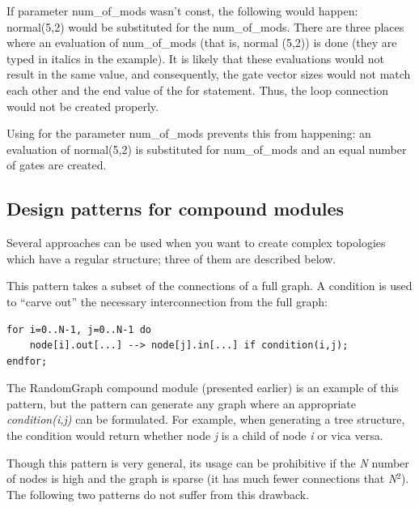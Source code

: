 If parameter num\_of\_mods wasn't const, the following would happen:\\
normal(5,2) would be substituted for the num\_of\_mods. There
are three places where an evaluation of num\_of\_mods (that is, normal
(5,2)) is done (they are typed in italics in the example). It
is likely that these evaluations would not result in the same
value, and consequently, the gate vector sizes would not match
each other and the end value of the for statement. Thus, the
loop connection would not be created properly.

Using  for the parameter num\_of\_mods
prevents this from happening: an evaluation of normal(5,2) is
substituted for num\_of\_mods and an equal number of gates are
created.





\subsection{Design patterns for compound modules}


Several approaches can be used when you want to create complex
topologies which have a regular structure; three of them are
described below.




This pattern takes a subset of the connections of a full graph.  A
condition is used to ``carve out'' the necessary interconnection from
the full graph:


\begin{Verbatim}[commandchars=\\\{\}]
for i=0..N-1, j=0..N-1 do
    node[i].out[...] --> node[j].in[...] if condition(i,j);
endfor;
\end{Verbatim}




The RandomGraph compound module (presented earlier) is an example of
this pattern, but the pattern can generate any graph where an
appropriate \textit{condition(i,j)} can be formulated. For example,
when generating a tree structure, the condition
would return whether node \textit{j} is a child of node \textit{i} or
vica versa.

Though this pattern is very general, its usage can be prohibitive if
the \textit{N} number of nodes is high and the graph is sparse (it has
much fewer connections that \textit{N}$^{\mathit{2}}$). The following
two patterns do not suffer from this drawback.


